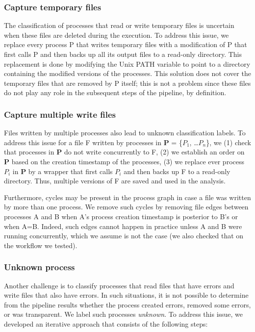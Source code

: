\documentclass[a4paper,num-refs]{oup-contemporary}
\begin{document}
\subsubsection{Capture temporary files} 
The classification of processes that read or 
write temporary files is uncertain when these files are deleted during 
the execution. To address this issue, we replace every process P that 
writes temporary files with a modification of P that first calls P and 
then backs up all its output files to a read-only directory. This 
replacement is done by modifying the Unix PATH variable to point to a 
directory containing the modified versions of the processes. This 
solution does not cover the temporary files that are removed by P 
itself; this is not a problem since these files do not play any role in 
the subsequent steps of the pipeline, by definition. 

\subsubsection{Capture multiple write files} 
Files written by multiple processes also lead 
to unknown classification labels. To address this issue for a file F 
written by processes in \textbf{P} = \{$P_{1}$, \ldots $P_{n}$\}, we 
(1) check that processes in \textbf{P} do not write concurrently to F, 
(2) we establish an order on \textbf{P} based on the creation timestamp 
of the processes, (3) we replace ever process $P_{i}$ in \textbf{P} by 
a wrapper that first calls $P_{i}$ and then backs up F to a read-only 
directory. Thus, multiple versions of F are saved and used in the 
analysis. 

Furthermore, cycles may be present in the process graph in case a file 
was written by more than one process. We remove such cycles by removing 
file edges between processes A and B when A's process creation 
timestamp is posterior to B's or when A=B. Indeed, such edges cannot 
happen in practice unless A and B were running concurrently, which we 
assume is not the case (we also checked that on the workflow we 
tested). 

\subsubsection{Unknown process} 
Another challenge is to classify processes that 
read files that have errors and write files that also have errors. In 
such situations, it is not possible to determine from the pipeline 
results whether the process created errors, removed some errors, or was 
transparent. We label such processes \emph{unknown}.
To address this issue, we developed an iterative approach that 
consists of the following steps: 
\end{document}
